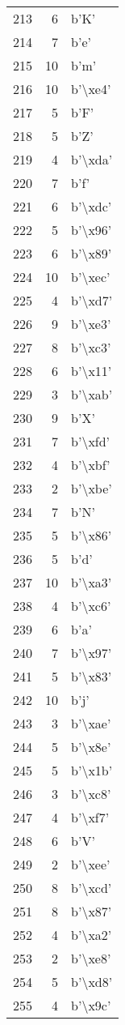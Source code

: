 \begin{tabular}{lrl}
213 &    6 &     b'K' \\
214 &    7 &     b'e' \\
215 &   10 &     b'm' \\
216 &   10 &  b'\textbackslash xe4' \\
217 &    5 &     b'F' \\
218 &    5 &     b'Z' \\
219 &    4 &  b'\textbackslash xda' \\
220 &    7 &     b'f' \\
221 &    6 &  b'\textbackslash xdc' \\
222 &    5 &  b'\textbackslash x96' \\
223 &    6 &  b'\textbackslash x89' \\
224 &   10 &  b'\textbackslash xec' \\
225 &    4 &  b'\textbackslash xd7' \\
226 &    9 &  b'\textbackslash xe3' \\
227 &    8 &  b'\textbackslash xc3' \\
228 &    6 &  b'\textbackslash x11' \\
229 &    3 &  b'\textbackslash xab' \\
230 &    9 &     b'X' \\
231 &    7 &  b'\textbackslash xfd' \\
232 &    4 &  b'\textbackslash xbf' \\
233 &    2 &  b'\textbackslash xbe' \\
234 &    7 &     b'N' \\
235 &    5 &  b'\textbackslash x86' \\
236 &    5 &     b'd' \\
237 &   10 &  b'\textbackslash xa3' \\
238 &    4 &  b'\textbackslash xc6' \\
239 &    6 &     b'a' \\
240 &    7 &  b'\textbackslash x97' \\
241 &    5 &  b'\textbackslash x83' \\
242 &   10 &     b'j' \\
243 &    3 &  b'\textbackslash xae' \\
244 &    5 &  b'\textbackslash x8e' \\
245 &    5 &  b'\textbackslash x1b' \\
246 &    3 &  b'\textbackslash xc8' \\
247 &    4 &  b'\textbackslash xf7' \\
248 &    6 &     b'V' \\
249 &    2 &  b'\textbackslash xee' \\
250 &    8 &  b'\textbackslash xcd' \\
251 &    8 &  b'\textbackslash x87' \\
252 &    4 &  b'\textbackslash xa2' \\
253 &    2 &  b'\textbackslash xe8' \\
254 &    5 &  b'\textbackslash xd8' \\
255 &    4 &  b'\textbackslash x9c' \\
\bottomrule
\end{tabular}
